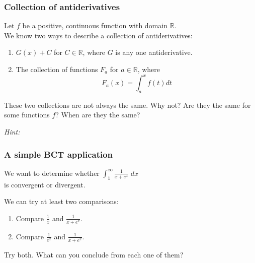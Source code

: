 \documentclass[14pt]{beamer}
\begin{document}
	\begin{frame}[t]
		\fontsize{13}{13}\selectfont
		\frametitle{Collection of antiderivatives}

		Let $\displaystyle f$ be a positive, continuous function with domain
		$\mathbb{R}$. \\ We know two ways to describe a collection of antiderivatives:
		\begin{enumerate}
			\item $\displaystyle G(x) + C$ for $C \in \mathbb{R}$, where $G$ is any
				one antiderivative.

			\item The collection of functions $\displaystyle F_{a}$ for $\displaystyle
				a \in \mathbb{R}$, where
				\[
					F_{a}(x) = \int_{a}^{x}f(t) dt
				\]
		\end{enumerate}

		These two collections are not always the same. Why not? Are they the same for
		some functions $f$? When are they the same?

		\vspace{2.5cm}
		\hfill \emph{Hint:} \quad \href{https://tinyurl.com/137antiderivatives}{}
	\end{frame}





	\begin{frame}[t]
		\fontsize{13}{13}\selectfont
		\frametitle{A simple BCT application}

		We want to determine whether $\displaystyle \int_{1}^{\infty}\frac{1}{x+e^{x}}
		\; dx$ \\ is convergent or divergent.

		We can try at least two comparisons:

		\begin{enumerate}
			\item Compare $\displaystyle \frac{1}{x}$ and $\displaystyle \frac{1}{x+ e^{x}}$.

			\item Compare $\displaystyle \frac{1}{e^{x}}$ and $\displaystyle \frac{1}{x+
				e^{x}}$.
		\end{enumerate}

		Try both. What can you conclude from each one of them?
	\end{frame}
\end{document}
